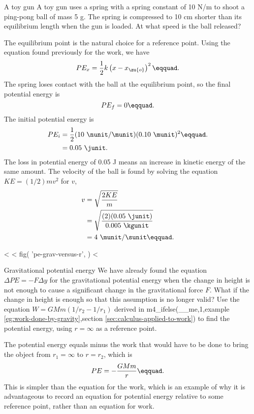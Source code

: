\begin{eg}{A toy gun}
\egquestion A toy gun uses a spring with a spring constant of 10 N/m to shoot a
ping-pong ball of mass 5 g. The spring is compressed to 10
cm shorter than its equilibrium length when the gun is
loaded. At what speed is the ball released?

\eganswer The equilibrium point is the natural choice for a
reference point. Using the equation found previously
for the work, we have
\begin{equation*}
                PE_x  =   \frac{1}{2}k\left(x-x_\zu{o}\right)^2\eqquad.
\end{equation*}
The spring loses contact with the ball at the equilibrium
point, so the final potential energy is
\begin{equation*}
                PE_f          =  0\eqquad.
\end{equation*}
The initial potential energy is
\begin{align*}
 PE_i &= \frac{1}{2}(10\ \nunit/\munit)(0.10\ \munit)^2\eqquad. \\
 &= 0.05\ \junit.
\end{align*}
The loss in potential energy of 0.05 J means an increase
in kinetic energy of the same amount. The velocity of the
ball is found by solving the equation $KE=(1/2)mv^2$ for $v$,
\begin{align*}
 v &= \sqrt{\frac{2KE}{m}}\\
 &= \sqrt{\frac{(2)(0.05\ \junit)}{0.005\ \kgunit}}\\
 &= 4\ \munit/\sunit\eqquad.
\end{align*}
\end{eg}

<%
<%
  fig(
    'pe-grav-versus-r',
  )
<%

\begin{eg}{Gravitational potential energy}\label{eg:pe-grav}
\egquestion We have already found the equation
$\Delta PE = -F\Delta y$ for the gravitational potential
energy when the change in height is not enough to cause a
significant change in the gravitational force $F$. What if
the change in height is enough so that this assumption is no
longer valid? Use the equation $W=GMm(1/r_2-1/r_1)$ derived in
m4_ifelse(__me,1,example \ref{eg:work-done-by-gravity},section \ref{sec:calculus-applied-to-work})
to find the potential energy, using $r=\infty$
as a reference point.

\eganswer The potential energy equals minus the work that
would have to be done to bring the object from $r_1=\infty$
 to $r= r_2$, which is
\begin{equation*}
                   PE  =  -\frac{GMm}{r}\eqquad.
\end{equation*}
This is simpler than the equation for the work, which is an
example of why it is advantageous to record an equation for
potential energy relative to some reference point, rather
than an equation for work.
\end{eg}

